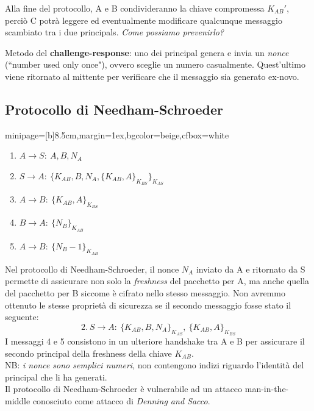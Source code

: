 \documentclass[a4paper, 11pt, notitlepage, fleqn]{report}
\newcommand{\fromto}[2]{#1\rightarrow #2\!:\ }
\newenvironment{colbox}[2]%
{%
	\par\noindent\hspace{10pt}
	\begin{adjustbox}{minipage=[b]{#2},margin=1ex,bgcolor=#1,cfbox=white}
}{%
	\end{adjustbox}\newline%
}
\begin{document}
Alla fine del protocollo, A e B condivideranno la chiave compromessa $K_{AB}'$, perciò C potrà leggere ed eventualmente modificare qualcunque messaggio scambiato tra i due principals.
\emph{Come possiamo prevenirlo?}

Metodo del \textbf{challenge-response}: uno dei principal genera e invia un \emph{nonce} (``number used only once"), ovvero sceglie un numero casualmente. Quest'ultimo viene ritornato al mittente per verificare che il messaggio sia generato ex-novo.

\subsection{Protocollo di Needham-Schroeder}\label{sec:NSSK}
\begin{colbox}{beige}{8.5cm}
	\begin{enumerate}
		\item $\fromto{A}{S}A, B, N_A$
		\item $\fromto{S}{A}\{K_{AB},B,N_A,\{K_{AB},A\}_{K_{BS}}\}_{K_{AS}}$
		\item $\fromto{A}{B}\{K_{AB},A\}_{K_{BS}}$
		\item $\fromto{B}{A}\{N_B\}_{K_{AB}}$
		\item $\fromto{A}{B}\{N_B-1\}_{K_{AB}}$
	\end{enumerate}
\end{colbox}

Nel protocollo di Needham-Schroeder, il nonce $N_A$ inviato da A e ritornato da S permette di assicurare non solo la \emph{freshness} del pacchetto per A, ma anche quella del pacchetto per B siccome è cifrato nello stesso messaggio. Non avremmo ottenuto le stesse proprietà di sicurezza se il secondo messaggio fosse stato il seguente:
\begin{equation*}
	2.\ S\rightarrow A\!:\ \{K_{AB},B,N_A\}_{K_{AS}},\ \{K_{AB},A\}_{K_{BS}}
\end{equation*}
I messaggi 4 e 5 consistono in un ulteriore handshake tra A e B per assicurare il secondo principal della freshness della chiave $K_{AB}$.\\
NB: \emph{i nonce sono semplici numeri}, non contengono indizi riguardo l'identità del principal che li ha generati.\\

Il protocollo di Needham-Schroeder è vulnerabile ad un attacco man-in-the-middle conosciuto come attacco di \emph{Denning and Sacco}.
\end{document}

